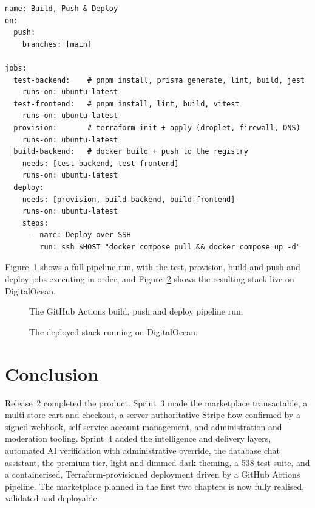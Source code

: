 \begin{lstlisting}[caption={GitHub Actions build-and-deploy pipeline (excerpt).},label={lst:deploy}]
name: Build, Push & Deploy
on:
  push:
    branches: [main]

jobs:
  test-backend:    # pnpm install, prisma generate, lint, build, jest
    runs-on: ubuntu-latest
  test-frontend:   # pnpm install, lint, build, vitest
    runs-on: ubuntu-latest
  provision:       # terraform init + apply (droplet, firewall, DNS)
    runs-on: ubuntu-latest
  build-backend:   # docker build + push to the registry
    needs: [test-backend, test-frontend]
    runs-on: ubuntu-latest
  deploy:
    needs: [provision, build-backend, build-frontend]
    runs-on: ubuntu-latest
    steps:
      - name: Deploy over SSH
        run: ssh $HOST "docker compose pull && docker compose up -d"
\end{lstlisting}

Figure~\ref{fig:devops-pipeline} shows a full pipeline run, with the test,
provision, build-and-push and deploy jobs executing in order, and
Figure~\ref{fig:devops-deploy} shows the resulting stack live on
DigitalOcean.

\begin{figure}[H]
  \centering
  \caption{The GitHub Actions build, push and deploy pipeline run.}
  \label{fig:devops-pipeline}
\end{figure}

\begin{figure}[H]
  \centering
  \caption{The deployed stack running on DigitalOcean.}
  \label{fig:devops-deploy}
\end{figure}

\section*{Conclusion}

Release~2 completed the product. Sprint~3 made the marketplace
transactable, a multi-store cart and checkout, a server-authoritative
Stripe flow confirmed by a signed webhook, self-service account
management, and administration and moderation tooling. Sprint~4 added the
intelligence and delivery layers, automated AI verification with
administrative override, the database chat assistant, the premium tier,
light and dimmed-dark theming, a 538-test suite, and a containerised,
Terraform-provisioned deployment driven by a GitHub Actions pipeline. The
marketplace planned in the first two chapters is now fully realised,
validated and deployable.
